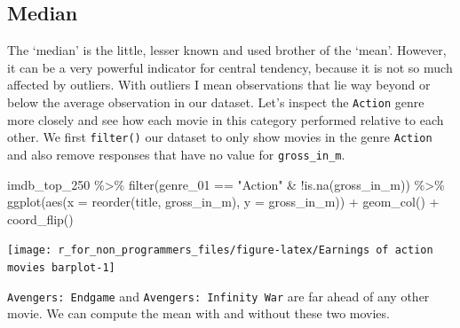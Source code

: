 \documentclass[
]{book}
\newenvironment{Shaded}{\begin{snugshade}}{\end{snugshade}}
\newcommand{\AttributeTok}[1]{\textcolor[rgb]{0.77,0.63,0.00}{#1}}
\newcommand{\FunctionTok}[1]{\textcolor[rgb]{0.00,0.00,0.00}{#1}}
\newcommand{\NormalTok}[1]{#1}
\newcommand{\SpecialCharTok}[1]{\textcolor[rgb]{0.00,0.00,0.00}{#1}}
\newcommand{\StringTok}[1]{\textcolor[rgb]{0.31,0.60,0.02}{#1}}
\begin{document}
\hypertarget{median}{%
\subsection{Median}\label{median}}

The `median' is the little, lesser known and used brother of the `mean'. However, it can be a very powerful indicator for central tendency, because it is not so much affected by outliers. With outliers I mean observations that lie way beyond or below the average observation in our dataset. Let's inspect the \texttt{Action} genre more closely and see how each movie in this category performed relative to each other. We first \texttt{filter()} our dataset to only show movies in the genre \texttt{Action} and also remove responses that have no value for \texttt{gross\_in\_m}.

\begin{Shaded}
\begin{Highlighting}[]
\NormalTok{imdb\_top\_250 }\SpecialCharTok{\%\textgreater{}\%} 
  \FunctionTok{filter}\NormalTok{(genre\_01 }\SpecialCharTok{==} \StringTok{"Action"} \SpecialCharTok{\&} \SpecialCharTok{!}\FunctionTok{is.na}\NormalTok{(gross\_in\_m)) }\SpecialCharTok{\%\textgreater{}\%} 
  \FunctionTok{ggplot}\NormalTok{(}\FunctionTok{aes}\NormalTok{(}\AttributeTok{x =} \FunctionTok{reorder}\NormalTok{(title, gross\_in\_m), }\AttributeTok{y =}\NormalTok{ gross\_in\_m)) }\SpecialCharTok{+} 
  \FunctionTok{geom\_col}\NormalTok{() }\SpecialCharTok{+}
  \FunctionTok{coord\_flip}\NormalTok{()}
\end{Highlighting}
\end{Shaded}

\begin{center}\texttt{[image: r\_for\_non\_programmers\_files/figure-latex/Earnings of action movies barplot-1]} \end{center}

\texttt{Avengers:\ Endgame} and \texttt{Avengers:\ Infinity\ War} are far ahead of any other movie. We can compute the mean with and without these two movies.
\end{document}
